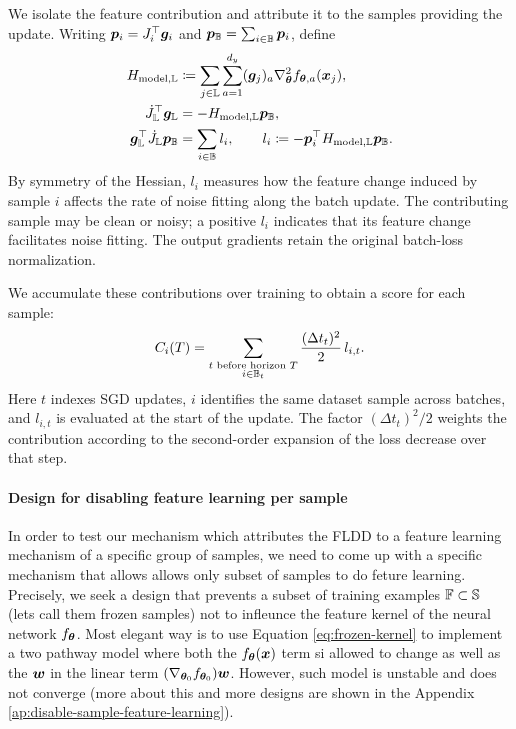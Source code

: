\documentclass[10pt]{article} %
\begin{document}
We isolate the feature contribution and attribute it to the samples
providing the update. Writing ${\bm{p}}_i=J_i^\top{\bm{g}}_i$ and
${\bm{p}}_{\mathbb{B}}=\sum_{i\in{\mathbb{B}}}{\bm{p}}_i$, define
\begin{align}
    H_{\mathrm{model},{\mathbb{L}}}
    &\coloneqq \sum_{j\in{\mathbb{L}}}\sum_{a=1}^{d_y}
        ({\bm{g}}_j)_a\nabla_{\bm{\theta}}^2 f_{{\bm{\theta}},a}({\bm{x}}_j), \\
    \dot{J}_{\mathbb{L}}^\top{\bm{g}}_{\mathbb{L}}
    &= -H_{\mathrm{model},{\mathbb{L}}}{\bm{p}}_{\mathbb{B}}, \\
    {\bm{g}}_{\mathbb{L}}^\top\dot{J}_{\mathbb{L}}{\bm{p}}_{\mathbb{B}}
    &= \sum_{i\in{\mathbb{B}}}l_i,
    \qquad l_i\coloneqq-{\bm{p}}_i^\top H_{\mathrm{model},{\mathbb{L}}}{\bm{p}}_{\mathbb{B}}.
    \label{eq:fldd-sample-contribution}
\end{align}
By symmetry of the Hessian, $l_i$ measures how the feature change induced
by sample $i$ affects the rate of noise fitting along the batch update.
The contributing sample may be clean or noisy; a positive $l_i$ indicates
that its feature change facilitates noise fitting. The output gradients
retain the original batch-loss normalization.

We accumulate these contributions over training to obtain a score for
each sample:
\begin{equation}
    C_i(T)=\sum_{\substack{t\text{ before horizon }T\\i\in{\mathbb{B}}_t}}
        \frac{(\Delta t_t)^2}{2}\,l_{i,t}.
    \label{eq:fldd-cumulative-contribution}
\end{equation}
Here $t$ indexes SGD updates, $i$ identifies the same dataset sample
across batches, and $l_{i,t}$ is evaluated at the start of the update.
The factor $(\Delta t_t)^2/2$ weights the contribution according to the
second-order expansion of the loss decrease over that step.


\paragraph{Design for disabling feature learning per sample} \label{sec:disable-sample-feature-learning}

In order to test our mechanism which attributes the FLDD to a feature learning mechanism of a specific group of samples, we need to come up with a specific mechanism that allows allows only subset of samples to do feture learning. Precisely, we seek a design that prevents a subset of training examples ${\mathbb{F}} \subset {\mathbb{S}}$ (lets call them frozen samples) not to infleunce the feature kernel of the neural network $f_{\bm{\theta}}$.  Most elegant way is to use Equation \ref{eq:frozen-kernel} to implement a two pathway model where both the $f_{\bm{\theta}}({\bm{x}})$ term si allowed to change as well as the ${\bm{w}}$ in the linear term $(\nabla_{{\bm{\theta}}_0} f_{{\bm{\theta}}_0}) {\bm{w}}$. However, such model is unstable and does not converge (more about this and more designs are shown in the Appendix \ref{ap:disable-sample-feature-learning}).
\end{document}
